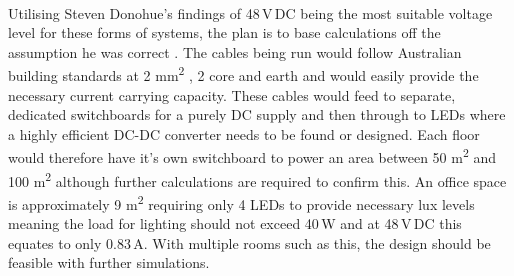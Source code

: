 \paragraph{}
Utilising Steven Donohue's findings of 48\,V\,DC being the most suitable voltage level for these forms  of systems, the plan is to base calculations off the assumption he was correct \cite{Donohue2014}. The cables being run would follow Australian building standards at 2 \si{mm^2} , 2 core and earth and would easily provide the necessary current carrying capacity. These cables would feed to separate, dedicated switchboards for a purely DC supply and then through to LEDs where a highly efficient DC-DC converter needs to be found or designed. Each floor would therefore have it's own switchboard to power an area between 50 \si{m^2} and 100 \si{m^2} although further calculations are required to confirm this. An office space is approximately 9 \si{m^2} requiring only 4 LEDs to provide necessary lux levels meaning the load for lighting should not exceed 40\,W and at 48\,V\,DC this equates to only 0.83\,A. With multiple rooms such as this, the design should be feasible with further simulations.  

\newpage